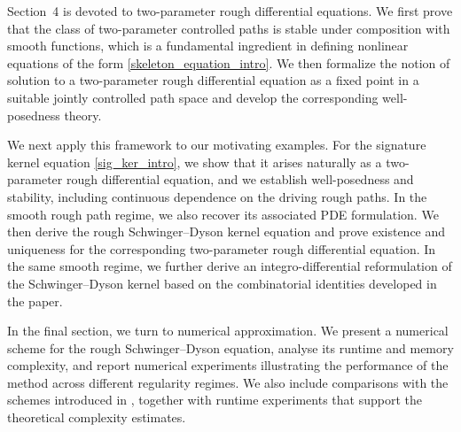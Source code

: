 \documentclass{article}%
\begin{document}
Section~4 is devoted to two-parameter rough differential equations. We first prove that the class of two-parameter controlled paths is stable under composition with smooth functions, which is a fundamental ingredient in defining nonlinear equations of the form \eqref{skeleton_equation_intro}. We then formalize the notion of solution to a two-parameter rough differential equation as a fixed point in a suitable jointly controlled path space and develop the corresponding well-posedness theory.

We next apply this framework to our motivating examples. For the signature kernel equation \eqref{sig_ker_intro}, we show that it arises naturally as a two-parameter rough differential equation, and we establish well-posedness and stability, including continuous dependence on the driving rough paths. In the smooth rough path regime, we also recover its associated PDE formulation. We then derive the rough Schwinger--Dyson kernel equation and prove existence and uniqueness for the corresponding two-parameter rough differential equation. In the same smooth regime, we further derive an integro-differential reformulation of the Schwinger--Dyson kernel based on the combinatorial identities developed in the paper.

In the final section, we turn to numerical approximation. We present a numerical scheme for the rough Schwinger--Dyson equation, analyse its runtime and memory complexity, and report numerical experiments illustrating the performance of the method across different regularity regimes. We also include comparisons with the schemes introduced in \cite{cass2024free}, together with runtime experiments that support the theoretical complexity estimates.
\end{document}
